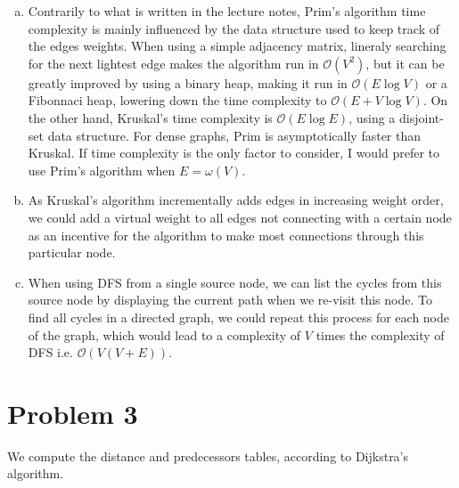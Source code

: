 \documentclass[a4paper, 10pt, twoside]{article}
\begin{document}
\begin{enumerate}[a)]
	\item Contrarily to what is written in the lecture notes, Prim's algorithm time complexity is mainly influenced by the data structure used to keep track of the edges weights. When using a simple adjacency matrix, lineraly searching for the next lightest edge makes the algorithm run in $\mathcal{O}(V^2)$, but it can be greatly improved by using a binary heap, making it run in $\mathcal{O}(E \log V)$ or a Fibonnaci heap, lowering down the time complexity to $\mathcal{O}(E + V \log V)$. On the other hand, Kruskal's time complexity is $\mathcal{O}(E \log E)$, using a disjoint-set data structure. For dense graphs, Prim is asymptotically faster than Kruskal. If time complexity is the only factor to consider, I would prefer to use Prim's algorithm when $E = \omega(V)$.

	\item As Kruskal's algorithm incrementally adds edges in increasing weight order, we could add a virtual weight to all edges not connecting with a certain node as an incentive for the algorithm to make most connections through this particular node.

	\item  When using DFS from a single source node, we can list the cycles from this source node by displaying the current path when we re-visit this node. To find all cycles in a directed graph, we could repeat this process for each node of the graph, which would lead to a complexity of $V$ times the complexity of DFS i.e. $\mathcal{O}(V(V+E))$.
\end{enumerate}

\section*{Problem 3}

We compute the distance and predecessors tables, according to Dijkstra's algorithm.
\end{document}
